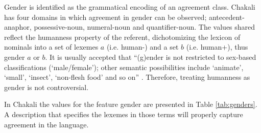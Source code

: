 \begin{exe}
\begin{exe}
\begin{exe}
{\begin{exe}
\begin{exe}
\begin{exe}
\begin{exe}
\begin{exe}
\begin{exe}
\begin{exe}
\begin{xlist}
\begin{exe}
\begin{exe}
\begin{exe}
\begin{exe}
\begin{exe}
\begin{exe}
\begin{exe}
\begin{exe}
\begin{exe}
\begin{exe}
\begin{exe}
\begin{exe}
Gender is identified as the grammatical encoding of an agreement class.  
Chakali has four domains
in which agreement in gender can be observed; antecedent-anaphor,
possessive-noun, numeral-noun and  quantifier-noun.
The values shared reflect the humanness property of the referent,
dichotomizing the lexicon of nominals into a set of lexemes $a$ (i.e.
human-) and a set $b$ (i.e.  human+), thus {\sc gender} $a$ or
$b$.  It is usually accepted that ``(g)ender is not restricted to
sex-based classifications (`male/female'); other semantic
possibilities include `animate', `small', `insect', `non-flesh food'
and so on'' \citep[293]{Corb00}. Therefore, treating humanness as gender
is not controversial.

In Chakali the values for the feature {\sc gender} are presented in
Table \ref{tab:genders}. A description that specifies the lexemes in those
terms will properly capture agreement in the language.


\begin{table}[htb!]
  \centering
  \caption{Gender in Chakali}
\label{tab:genders}







\end{table}
\end{exe}
\end{exe}
\end{exe}
\end{exe}
\end{exe}
\end{exe}
\end{exe}
\end{exe}
\end{exe}
\end{exe}
\end{exe}
\end{exe}
\end{xlist}
\end{exe}
\end{exe}
\end{exe}
\end{exe}
\end{exe}
\end{exe}
\end{exe}}
\end{exe}
\end{exe}
\end{exe}
